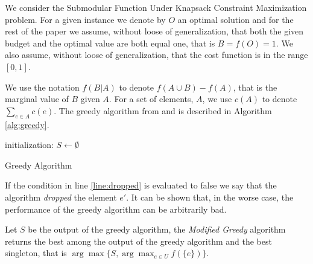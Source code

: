 We consider the Submodular Function Under
Knapsack Constraint Maximization problem.
For a given instance we denote by $O$ an optimal solution and for the rest of the 
paper we assume, without loose of generalization, that both the 
given budget and the optimal value are both equal one, that is $B = f(O) = 1$.
We also assume, without loose of generalization, 
that the cost function is in the range $[0, 1]$.
 
We use the notation $f(B|A)$ to denote $f(A \cup B) - f(A)$, that is the marginal value of $B$
given $A$. 
For a set of elements, $A$, we use $c(A)$ to denote $\sum_{e \in A}c(e)$.
The greedy algorithm from \cite{khuller1999budgeted} and \cite{krause2005note}
is described in Algorithm \ref{alg:greedy}.

\begin{algorithm}[H]
\label{alg:greedy}



initialization: $S \leftarrow \emptyset$
\\
\caption{Greedy Algorithm}
\end{algorithm}
 
If the condition in line \ref{line:dropped} is evaluated to false we say that the algorithm 
\emph{dropped} the element $e'$.
It can be shown that, in the worse case, the performance of the greedy algorithm 
can be arbitrarily bad.

Let $S$ be the output of the greedy algorithm, the \emph{Modified Greedy} algorithm 
returns the best among the output of the greedy algorithm
and the best singleton, that is $\arg\max\{S, \displaystyle{\arg\max_{e \in U}}f(\{e\})\}$.  

